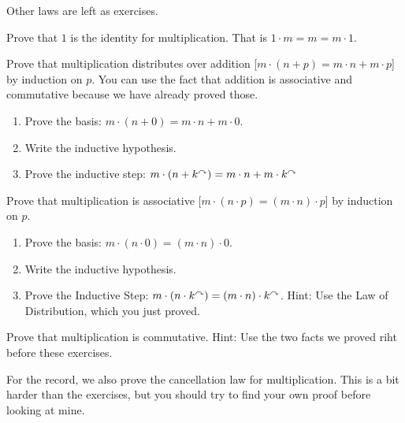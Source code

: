 Other laws are left as exercises.

\ipadbreak

\begin{exercises}
\item Prove that $1$ is the identity for multiplication. That is $1\cdot m = m  = m\cdot 1$.
\item Prove that multiplication distributes over addition [$m\cdot
  (n+p) = m\cdot n + m\cdot p$] by induction on $p$.  You can use the
  fact that addition is associative and commutative because we have
  already proved those.
  \begin{enumerate}
  \item Prove the basis: $m\cdot(n+0) = m\cdot n + m\cdot 0$.
  \item Write the inductive hypothesis.
  \item Prove the inductive step: $m\cdot(n+k^\curvearrowright) = m\cdot n +
    m\cdot k^\curvearrowright$
  \end{enumerate}
 
\item Prove that multiplication is associative [$m\cdot(n\cdot p) =
  (m\cdot n)\cdot p$] by induction on $p$.
  \begin{enumerate}
  \item Prove the basis: $m\cdot (n\cdot 0) = (m\cdot n)\cdot 0$.
  \item Write the inductive hypothesis.
  \item Prove the Inductive Step: $m\cdot (n\cdot k^\curvearrowright) = (m\cdot
    n)\cdot k^\curvearrowright$. Hint: Use the Law of Distribution, which you just
    proved.
  \end{enumerate}

\item Prove that multiplication is commutative. Hint: Use the two facts 
we proved riht before these exercises.

\end{exercises}

\ipadbreak

For the record, we also prove the cancellation law for multiplication. This is 
a bit harder than the exercises, but you should try to find your own proof before looking at mine.

